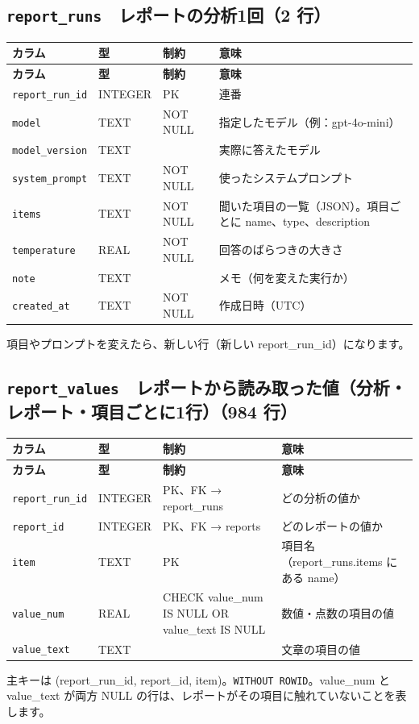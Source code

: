 \documentclass[xelatex,ja=standard,jafont=hiragino-pron,a4paper,10pt]{bxjsreport}
\begin{document}
\subsection*{\texttt{report\_\allowbreak{}runs}　レポートの分析1回（2 行）}
{\footnotesize
\begin{longtable}{p{3.30cm}p{1.40cm}p{3.00cm}p{6.40cm}}
\toprule
\textbf{カラム} & \textbf{型} & \textbf{制約} & \textbf{意味} \\
\midrule
\endfirsthead
\toprule
\textbf{カラム} & \textbf{型} & \textbf{制約} & \textbf{意味} \\
\midrule
\endhead
\bottomrule
\endfoot
\texttt{report\_\allowbreak{}run\_\allowbreak{}id} & INTEGER & PK & 連番 \\
\texttt{model} & TEXT & NOT NULL & 指定したモデル（例：gpt-4o-mini） \\
\texttt{model\_\allowbreak{}version} & TEXT &  & 実際に答えたモデル \\
\texttt{system\_\allowbreak{}prompt} & TEXT & NOT NULL & 使ったシステムプロンプト \\
\texttt{items} & TEXT & NOT NULL & 聞いた項目の一覧（JSON）。項目ごとに name、type、description \\
\texttt{temperature} & REAL & NOT NULL & 回答のばらつきの大きさ \\
\texttt{note} & TEXT &  & メモ（何を変えた実行か） \\
\texttt{created\_\allowbreak{}at} & TEXT & NOT NULL & 作成日時（UTC） \\
\end{longtable}
}
{\small 項目やプロンプトを変えたら、新しい行（新しい report\_run\_id）になります。\par}
\medskip
\subsection*{\texttt{report\_\allowbreak{}values}　レポートから読み取った値（分析・レポート・項目ごとに1行）（984 行）}
{\footnotesize
\begin{longtable}{p{3.30cm}p{1.40cm}p{3.00cm}p{6.40cm}}
\toprule
\textbf{カラム} & \textbf{型} & \textbf{制約} & \textbf{意味} \\
\midrule
\endfirsthead
\toprule
\textbf{カラム} & \textbf{型} & \textbf{制約} & \textbf{意味} \\
\midrule
\endhead
\bottomrule
\endfoot
\texttt{report\_\allowbreak{}run\_\allowbreak{}id} & INTEGER & PK、FK → report\_runs & どの分析の値か \\
\texttt{report\_\allowbreak{}id} & INTEGER & PK、FK → reports & どのレポートの値か \\
\texttt{item} & TEXT & PK & 項目名（report\_runs.items にある name） \\
\texttt{value\_\allowbreak{}num} & REAL & CHECK value\_num IS NULL OR value\_text IS NULL & 数値・点数の項目の値 \\
\texttt{value\_\allowbreak{}text} & TEXT &  & 文章の項目の値 \\
\end{longtable}
}
{\small 主キーは (report\_run\_id, report\_id, item)。\texttt{WITHOUT ROWID}。value\_num と value\_text が両方 NULL の行は、レポートがその項目に触れていないことを表します。\par}
\medskip
\end{document}
